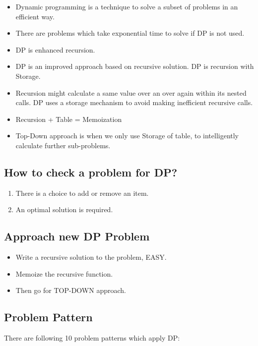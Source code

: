 \documentclass[12pt]{article}
\begin{document}
\begin{itemize}
\item Dynamic programming is a technique to solve a subset of problems in an efficient way. 

\item There are problems which take exponential time to solve if DP is not used. 

\item DP is enhanced recursion. 

\item DP is an improved approach based on recursive solution. DP is recursion with Storage. 

\item Recursion might calculate a same value over an over again within its nested calls. DP uses a storage mechanism to avoid making inefficient recursive calls. 

\item Recursion + Table = Memoization

\item Top-Down approach is when we only use Storage of table, to intelligently calculate further sub-problems. 
\end{itemize}

\subsection{How to check a problem for DP?}
\begin{enumerate}
\item There is a choice to add or remove an item.
\item An optimal solution is required.  
\end{enumerate}

\subsection{Approach new DP Problem}
\begin{itemize}
\item Write a recursive solution to the problem, EASY.
\item Memoize the recursive function. 
\item Then go for TOP-DOWN approach. 
\end{itemize}

\pagebreak

\subsection{Problem Pattern}
There are following 10 problem patterns which apply DP:
\end{document}

